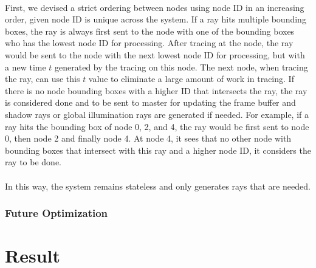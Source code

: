 \documentclass[a4paper, oneside, 10pt]{article}
\begin{document}
\paragraph{} First, we devised a strict ordering between nodes using node ID in an increasing order, given node ID is unique across the system. If a ray hits multiple bounding boxes, the ray is always first sent to the node with one of the bounding boxes who has the lowest node ID for processing.  After tracing at the node, the ray would be sent to the node with the next lowest node ID for processing, but with a new time $t$ generated by the tracing on this node. The next node, when tracing the ray, can use this $t$ value to eliminate a large amount of work in tracing. If there is no node bounding boxes with a higher ID that intersects the ray, the ray is considered done and to be sent to master for updating the frame buffer and shadow rays or global illumination rays are generated if needed.  For example, if a ray hits the bounding box of node 0, 2, and 4, the ray would be first sent to node 0, then node 2 and finally node 4. At node 4, it sees that no other node with bounding boxes that intersect with this ray and a higher node ID, it considers the ray to be done.
\paragraph{} In this way, the system remains stateless and only generates rays that are needed.

\subsubsection{Future Optimization}
\section{Result}





\end{document}
